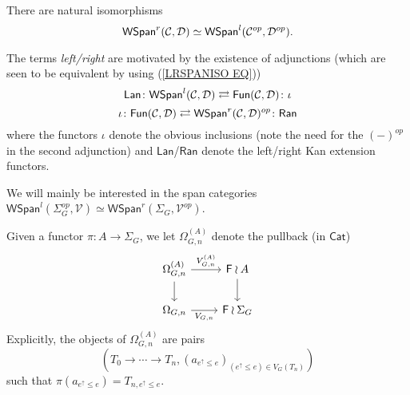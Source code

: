 \documentclass[a4paper,10pt]{article}%
\begin{document}
\begin{remark}
There are natural isomorphisms
\begin{equation}\label{LRSPANISO EQ}
\mathsf{WSpan}^r(\mathcal{C},\mathcal{D}) \simeq \mathsf{WSpan}^l(\mathcal{C}^{op},\mathcal{D}^{op}).
\end{equation}
\end{remark}


\begin{remark}\label{RANLANADJ REM}
The terms \textit{left/right} are motivated by the existence of adjunctions (which are seen to be equivalent by using (\ref{LRSPANISO EQ}))
\[
	\mathsf{Lan} \colon
	\mathsf{WSpan}^l(\mathcal{C}, \mathcal{D})
		\rightleftarrows
	\mathsf{Fun}(\mathcal{C}, \mathcal{D})
	\colon \iota
\]
\[
	\iota \colon 
	\mathsf{Fun}(\mathcal{C}, \mathcal{D})
		\rightleftarrows
	\mathsf{WSpan}^r(\mathcal{C}, \mathcal{D})^{op}
	\colon \mathsf{Ran}
\]
where the functors $\iota$ denote the obvious inclusions 
(note the need for the $(\minus)^{op}$ in the second adjunction) 
and $\mathsf{Lan}$/$\mathsf{Ran}$ denote the left/right Kan extension functors.
\end{remark}


We will mainly be interested in the span categories 
$\mathsf{WSpan}^l(\Sigma_G^{op},\mathcal{V})\simeq 
\mathsf{WSpan}^r(\Sigma_G,\mathcal{V}^{op})$.


\begin{notation}\label{OMEGAGNA NOT}
	Given a functor $\pi \colon A \to \Sigma_G$, we let $\Omega^{(A)}_{G,n}$ denote the pullback (in $\mathsf{Cat}$)
\[
	\begin{tikzcd}
	\Omega_{G,n}^{(A)} \ar{r}{V_{G,n}^{(A)}} \ar{d}& 
	\Fin \wr A \ar{d}
\\
	\Omega_{G,n} \ar{r}[swap]{V_{G,n}} &
	\Fin \wr \Sigma_G
	\end{tikzcd}
\]
Explicitly, the objects of $\Omega_{G,n}^{(A)}$ are pairs 
\begin{equation}\label{OMEGAGNA EQ}
(T_0 \to \cdots \to T_n,
(a_{e^{\uparrow} \leq e})_{(e^{\uparrow} \leq e)\in V_G(T_n)})
\end{equation}
such that $\pi(a_{e^{\uparrow} \leq e}) = T_{n,e^{\uparrow} \leq e}$.
\end{notation}
\end{document}
